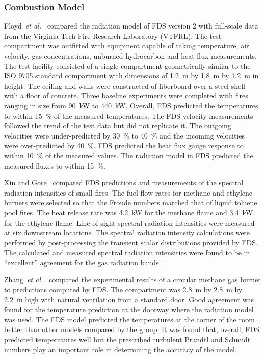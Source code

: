 \subsubsection{Combustion Model}

Floyd~{\em et al.}~\cite{Floyd:1,Floyd:6} compared the radiation model of  FDS version 2  with full-scale  data from  the Virginia  Tech Fire
Research Laboratory (VTFRL).  The  test compartment was outfitted with equipment   capable   of  taking   temperature,   air  velocity,   gas
concentrations, unburned hydrocarbon  and heat flux measurements.  The test facility consisted of  a single compartment geometrically similar to the
ISO 9705 standard compartment with dimensions of 1.2~m by 1.8~m by  1.2~m  in height.   The  ceiling  and  walls were  constructed  of fiberboard
over  a steel  shell  with  a  floor of  concrete.   Three baseline experiments  were completed with  fires ranging in  size from 90~kW  to 440~kW.
Overall,  FDS  predicted  the  temperatures  to within  15~\%  of  the measured  temperatures.  The  FDS velocity  measurements  followed the trend
of  the test  data  but did  not  replicate  it.  The  outgoing velocities  were under-predicted by  30~\% to  40~\% and  the incoming velocities
were  over-predicted by 40~\%. FDS predicted  the heat flux gauge response to within 10~\%  of the measured values.  The radiation model  in FDS
predicted the  measured  fluxes to  within 15~\%.

Xin   and  Gore~\cite{Xin:JSS2003}   compared   FDS  predictions   and measurements  of the  spectral radiation  intensities of  small fires. The
fuel flow rates for  methane and ethylene burners were selected so that the  Froude numbers  matched that of  liquid toluene  pool fires. The heat
release rate was 4.2~kW  for the methane flame and 3.4~kW for the ethylene flame.  Line of sight spectral radiation intensities were measured  at
six  downstream  locations.    The  spectral  radiation intensity calculations were performed by post-processing the transient scalar  distributions
provided  by FDS.   The calculated  and measured spectral  radiation  intensities were  found  to  be in  ``excellent'' agreement for the gas
radiation bands.

Zhang~{\em et al.}~\cite{Zhang:1} compared the experimental results of a  circular methane  gas burner  to predictions  computed by  FDS. The
compartment was 2.8~m by 2.8~m  by 2.2~m high with natural ventilation from a  standard door.  Good agreement was  found for  the temperature
prediction at the doorway where  the radiation model was used. The FDS model predicted the temperatures at the corner of the room better than other
models  compared by the group.  It was found  that, overall, FDS predicted temperatures  well but the prescribed  turbulent Prandtl and Schmidt
numbers play an important  role in determining the accuracy of the model.


